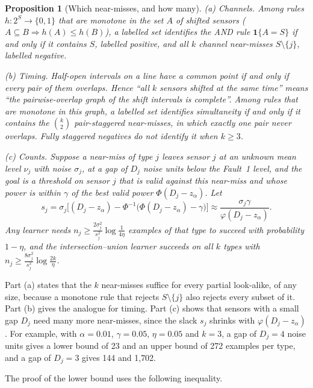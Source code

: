 \documentclass[11pt]{article}
\numberwithin{equation}{section}
\theoremstyle{plain}
\newtheorem{proposition}{Proposition}
\newcommand{\one}{\mathbf{1}}
\begin{document}
\begin{proposition}[Which near-misses, and how many]\label{prop:nm}
(a) \emph{Channels.} Among rules $h:2^S\to\{0,1\}$ that are monotone in the set $A$ of shifted sensors ($A\subseteq B\Rightarrow h(A)\le h(B)$), a labelled set identifies the AND rule $\one\{A=S\}$ if and only if it contains $S$, labelled positive, and all $k$ channel near-misses $S\setminus\{j\}$, labelled negative.

(b) \emph{Timing.} Half-open intervals on a line have a common point if and only if every pair of them overlaps. Hence ``all $k$ sensors shifted at the same time'' means ``the pairwise-overlap graph of the shift intervals is complete''. Among rules that are monotone in this graph, a labelled set identifies simultaneity if and only if it contains the $\binom k2$ pair-staggered near-misses, in which exactly one pair never overlaps. Fully staggered negatives do not identify it when $k\ge3$.

(c) \emph{Counts.} Suppose a near-miss of type $j$ leaves sensor $j$ at an unknown mean level $\nu_j$ with noise $\sigma_j$, at a gap of $D_j$ noise units below the Fault~1 level, and the goal is a threshold on sensor $j$ that is valid against this near-miss and whose power is within $\gamma$ of the best valid power $\Phi(D_j-z_\alpha)$. Let
\begin{equation}\label{eq:slack}
  s_j=\sigma_j\Big[(D_j-z_\alpha)-\Phi^{-1}\big(\Phi(D_j-z_\alpha)-\gamma\big)\Big]\approx\frac{\sigma_j\gamma}{\varphi(D_j-z_\alpha)}.
\end{equation}
Any learner needs $n_j\ge\frac{2\sigma_j^2}{s_j^2}\log\frac1{4\eta}$ examples of that type to succeed with probability $1-\eta$, and the intersection--union learner succeeds on all $k$ types with $n_j\ge\frac{8\sigma_j^2}{s_j^2}\log\frac{2k}{\eta}$.
\end{proposition}

Part (a) states that the $k$ near-misses suffice for every partial look-alike, of any size, because a monotone rule that rejects $S\setminus\{j\}$ also rejects every subset of it. Part (b) gives the analogue for timing. Part (c) shows that sensors with a small gap $D_j$ need many more near-misses, since the slack $s_j$ shrinks with $\varphi(D_j-z_\alpha)$. For example, with $\alpha=0.01$, $\gamma=0.05$, $\eta=0.05$ and $k=3$, a gap of $D_j=4$ noise units gives a lower bound of 23 and an upper bound of 272 examples per type, and a gap of $D_j=3$ gives 144 and 1{,}702.

The proof of the lower bound uses the following inequality.
\end{document}
